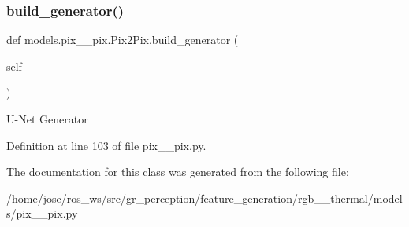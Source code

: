 \subsubsection{\texorpdfstring{build\+\_\+generator()}{build\_generator()}}
{\footnotesize\ttfamily def models.\+pix\+\_\+\_\+pix.\+Pix2\+Pix.\+build\+\_\+generator (\begin{DoxyParamCaption}\item[{}]{self }\end{DoxyParamCaption})}

\begin{DoxyVerb}U-Net Generator\end{DoxyVerb}
 

Definition at line 103 of file pix\+\_\+\_\+pix.\+py.



The documentation for this class was generated from the following file\+:\begin{DoxyCompactItemize}
\item 
/home/jose/ros\+\_\+ws/src/gr\+\_\+perception/feature\+\_\+generation/rgb\+\_\+\_\+thermal/models/pix\+\_\+\_\+pix.\+py\end{DoxyCompactItemize}
